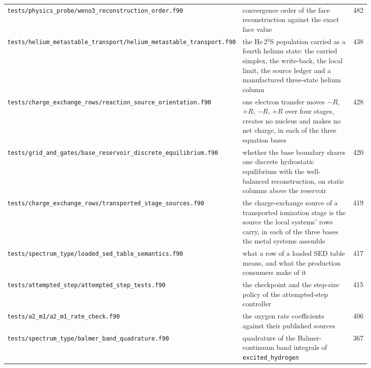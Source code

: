 {\begin{longtable}{@{}>{\raggedright\arraybackslash}p{0.36\linewidth} >{\raggedright\arraybackslash}p{0.50\linewidth} r@{}}
\texttt{tests/\allowbreak physics\_\allowbreak probe/\allowbreak weno3\_\allowbreak reconstruction\_\allowbreak order.f90} & convergence order of the face reconstruction against the exact face value & 482 \\
\texttt{tests/\allowbreak helium\_\allowbreak metastable\_\allowbreak transport/\allowbreak helium\_\allowbreak metastable\_\allowbreak transport.f90} & the He\,2$^3$S population carried as a fourth helium state: the carried simplex, the write-back, the local limit, the source ledger and a manufactured three-state helium column & 438 \\
\texttt{tests/\allowbreak charge\_\allowbreak exchange\_\allowbreak rows/\allowbreak reaction\_\allowbreak source\_\allowbreak orientation.f90} & one electron transfer moves $-R$, $+R$, $-R$, $+R$ over four stages, creates no nucleus and makes no net charge, in each of the three equation bases & 428 \\
\texttt{tests/\allowbreak grid\_\allowbreak and\_\allowbreak gates/\allowbreak base\_\allowbreak reservoir\_\allowbreak discrete\_\allowbreak equilibrium.f90} & whether the base boundary shares one discrete hydrostatic equilibrium with the well-balanced reconstruction, on static columns above the reservoir & 420 \\
\texttt{tests/\allowbreak charge\_\allowbreak exchange\_\allowbreak rows/\allowbreak transported\_\allowbreak stage\_\allowbreak sources.f90} & the charge-exchange source of a transported ionization stage is the source the local systems' rows carry, in each of the three bases the metal systems assemble & 419 \\
\texttt{tests/\allowbreak spectrum\_\allowbreak type/\allowbreak loaded\_\allowbreak sed\_\allowbreak table\_\allowbreak semantics.f90} & what a row of a loaded SED table means, and what the production consumers make of it & 417 \\
\texttt{tests/\allowbreak attempted\_\allowbreak step/\allowbreak attempted\_\allowbreak step\_\allowbreak tests.f90} & the checkpoint and the step-size policy of the attempted-step controller & 415 \\
\texttt{tests/\allowbreak a2\_\allowbreak m1/\allowbreak a2\_\allowbreak m1\_\allowbreak rate\_\allowbreak check.f90} & the oxygen rate coefficients against their published sources & 406 \\
\texttt{tests/\allowbreak spectrum\_\allowbreak type/\allowbreak balmer\_\allowbreak band\_\allowbreak quadrature.f90} & quadrature of the Balmer-continuum band integrals of \texttt{excited\_hydrogen} & 367 \\

\end{longtable}}
